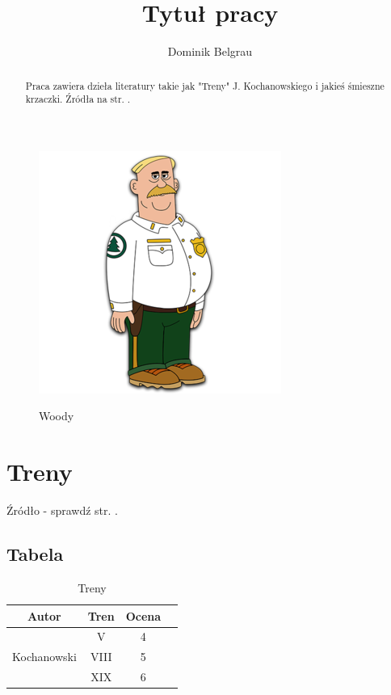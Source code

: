 \documentclass{article}
\title{Tytuł pracy}
\author{Dominik Belgrau}
\begin{document}
\maketitle

\begin{abstract}
    Praca zawiera dzieła literatury takie jak "Treny" J. Kochanowskiego i jakieś śmieszne krzaczki. Źródła na str. \pageref{bb}.
\end{abstract}
\begin{figure}[h!]
\includegraphics[scale=2]{woody.png} \label{o0}
\caption{Woody}
\end{figure}


\newpage

\tableofcontents
\listoftables
\listoffigures

\newpage

\section{Treny}

Źródło - sprawdź str. \pageref{bb}.

\subsection{Tabela} \label{tab}
\begin{table}
\begin{center}
\begin{tabular}{ |c|c|c|c| } 
\hline
Autor & Tren & Ocena \\
\hline
\multirow{3}{8em}{Kochanowski}  & V & 4 \\ 
& VIII & 5 \\ 
& XIX & 6 \\ 
\hline
\end{tabular}
\caption{Treny}
\end{center}
\end{table}
\end{document}
